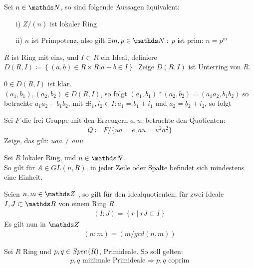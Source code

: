 \documentclass[ngerman, parskip=half, titlepage=false]{scrartcl}
\begin{document}
\begin{Satz}
  Sei $n \in \N$, so sind folgende Aussagen äquivalent:\\
  \begin{itemize}
    \item[i)] $Z/(n)$ ist lokaler Ring
    \item[ii)] $n$ ist Primpotenz, also gilt $\exists m,p \in \N : $ 
      $p$ ist prim: $n=p^m$
    \end{itemize}
\end{Satz}

$R$ ist Ring mit eins, und $I \subset R$ ein Ideal, definiere $D(R,I) \coloneqq
\left\{ (a,b) \in R \times R \Big| a-b \in I  \right\}$. Zeige $D(R,I)$ ist
Unterring von $R$.

$ 0 \in D(R,I)$ ist klar.\\

$(a_1,b_1),(a_2,b_2) \in D(R,I)$, so folgt $(a_1,b_1)*(a_2,b_2) = (a_1a_2,b_1b_2)$
so betrachte $a_1a_2 - b_1b_2$, mit $\exists i_1,i_2 \in I: a_1 = b_1 + i_1$ und
$a_2 = b_2 + i_2$, so folgt\\

\begin{Satz}
  Sei $F$ die frei Gruppe mit den Erzeugern $a,u$, betrachte den
  Quotienten:
  \begin{gather*}
    Q \coloneqq F/\{ ua=e, au=u^2a^2 \}
  \end{gather*}
  Zeige, das gilt: $uaa \neq auu$
\end{Satz}

\begin{Lem}
  Sei $R$ lokaler Ring, und $n \in \N$.\\
  So gilt für $A \in GL(n,R)$, in jeder Zeile oder Spalte befindet
  sich mindestens eine Einheit.
\end{Lem}

\begin{Lem}
  Seien $n, m \in \Z$ , so gilt für den Idealquotienten, für zwei
  Ideale $I,J \subset \R$ von einem Ring $R$
  \begin{gather*}
    \left( I:J \right) = \left\{ r \; \Big| \; r J \subset I   \right\}
  \end{gather*}
  Es gilt nun in $\Z$
  \begin{gather*}
    (n:m) = (m / gcd(n,m))
  \end{gather*}
\end{Lem}

\begin{Beh}
  Sei $R$ Ring und $p,q \in Spec \left( R \right)$, Primideale. So soll gelten:
  \begin{gather*}
    p,q \text{ minimale Primideale} \Rightarrow p,q \text{ coprim}
  \end{gather*}    
\end{Beh}
\end{document}

